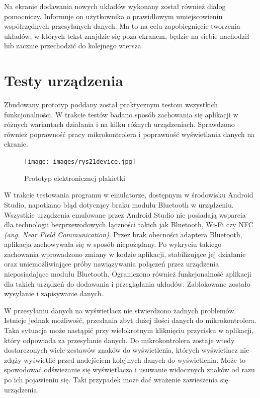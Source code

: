 \documentclass[a4paper,12pt, twoside]{article}
\begin{document}
    	Na ekranie dodawania nowych układów wykonany został również dialog pomocniczy. Informuje on użytkownika o prawidłowym umiejscowieniu współrzędnych przesyłanych danych. Ma to na celu zapobiegnięcie tworzenia układów, w których tekst znajdzie się poza ekranem, będzie na siebie nachodził lub zacznie przechodzić do kolejnego wiersza.
    	
        \newpage
    	\section{Testy urządzenia}
    	Zbudowany prototyp poddany został praktycznym testom wszystkich funkcjonalności. W trakcie testów badano sposób zachowania się aplikacji w różnych wariantach działania i na kilku różnych urządzeniach. Sprawdzono również poprawność pracy mikrokontrolera i poprawność wyświetlania danych na ekranie.
    	
    	\begin{figure}[H]
    	        \centering
    			\texttt{[image: images/rys21device.jpg]}
    		    \caption{Prototyp elektronicznej plakietki}
                \label{fig:device}
    	\end{figure}
    	
    	W trakcie testowania programu w emulatorze, dostępnym w środowisku Android Studio, napotkano błąd dotyczący braku modułu Bluetooth w urządzeniu. Wszystkie urządzenia emulowane przez Android Studio nie posiadają wsparcia dla technologii bezprzewodowych łączności takich jak Bluetooth, Wi-Fi czy NFC \textit{(ang. Near Field Communication)}. Przez brak obecności adaptera Bluetooth, aplikacja zachowywała się w sposób niepożądany. Po wykryciu takiego zachowania wprowadzono zmiany w kodzie aplikacji, stabilizujące jej działanie oraz uniemożliwiające próby nawiązywania połączeń przez urządzenia nieposiadające modułu Bluetooth. Ograniczono również funkcjonalność aplikacji dla takich urządzeń do dodawania i przeglądania układów. Zablokowane zostało wysyłanie i zapisywanie danych.
    	
    	W przesyłaniu danych na wyświetlacz nie stwierdzono żadnych problemów. Istnieje jednak możliwość, przesłania zbyt dużej ilości danych do mikrokontrolera. Taka sytuacja może nastąpić przy wielokrotnym kliknięciu przycisku w aplikacji, który odpowiada za przesyłanie danych. Do mikrokontrolera zostaje wtedy dostarczonych wiele zestawów znaków do wyświetlenia, których wyświetlacz nie zdąży wyświetlić przed nadejściem kolejnych danych do wyświetlenia. Może to spowodować odświeżanie się wyświetlacza i usuwanie widocznych znaków od razu po ich pojawieniu się. Taki przypadek może dać wrażenie zawieszenia się urządzenia. 
    	
\end{document}
